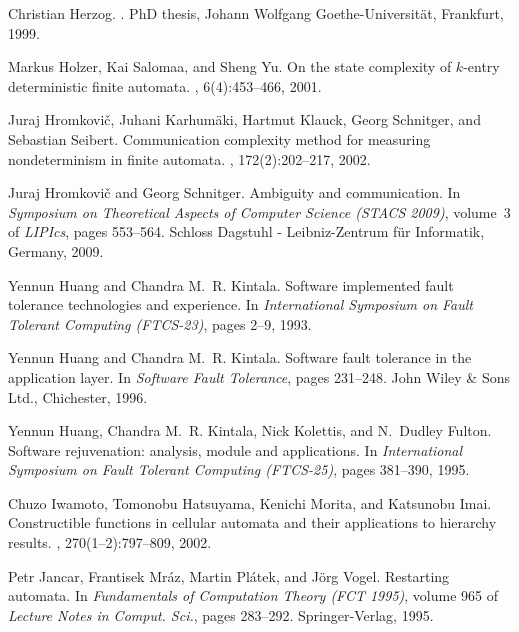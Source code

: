 \documentclass[copyright]{eptcs}
\begin{document}
\begin{thebibliography}{10}
Christian Herzog.
.
\newblock PhD thesis, Johann Wolfgang Goethe-Universit{\"a}t, Frankfurt, 1999.

Markus Holzer, Kai Salomaa, and Sheng Yu.
\newblock On the state complexity of $k$-entry deterministic finite automata.
, 6(4):453--466, 2001.

Juraj Hromkovi{\v{c}}, Juhani Karhum{\"a}ki, Hartmut Klauck, Georg Schnitger,
  and Sebastian Seibert.
\newblock Communication complexity method for measuring nondeterminism in
  finite automata.
, 172(2):202--217, 2002.

Juraj Hromkovi{\v{c}} and Georg Schnitger.
\newblock Ambiguity and communication.
\newblock In {\em Symposium on Theoretical Aspects of Computer Science ({STACS}
  2009)}, volume~3 of {\em LIPIcs}, pages 553--564. Schloss Dagstuhl -
  Leibniz-Zentrum f{\"u}r Informatik, Germany, 2009.

Yennun Huang and Chandra M.~R. Kintala.
\newblock Software implemented fault tolerance technologies and experience.
\newblock In {\em International Symposium on Fault Tolerant Computing
  (FTCS-23)}, pages 2--9, 1993.

Yennun Huang and Chandra M.~R. Kintala.
\newblock Software fault tolerance in the application layer.
\newblock In {\em Software Fault Tolerance}, pages 231--248. John Wiley \& Sons
  Ltd., Chichester, 1996.

Yennun Huang, Chandra M.~R. Kintala, Nick Kolettis, and N.~Dudley Fulton.
\newblock Software rejuvenation: analysis, module and applications.
\newblock In {\em International Symposium on Fault Tolerant Computing
  (FTCS-25)}, pages 381--390, 1995.

Chuzo Iwamoto, Tomonobu Hatsuyama, Kenichi Morita, and Katsunobu Imai.
\newblock Constructible functions in cellular automata and their applications
  to hierarchy results.
, 270(1--2):797--809, 2002.

Petr Jancar, Frantisek Mr{\'a}z, Martin Pl{\'a}tek, and J{\"o}rg Vogel.
\newblock Restarting automata.
\newblock In {\em Fundamentals of Computation Theory (FCT 1995)}, volume 965 of
  {\em Lecture Notes in Comput. Sci.}, pages 283--292. Springer-Verlag, 1995.


\end{thebibliography}
\end{document}
